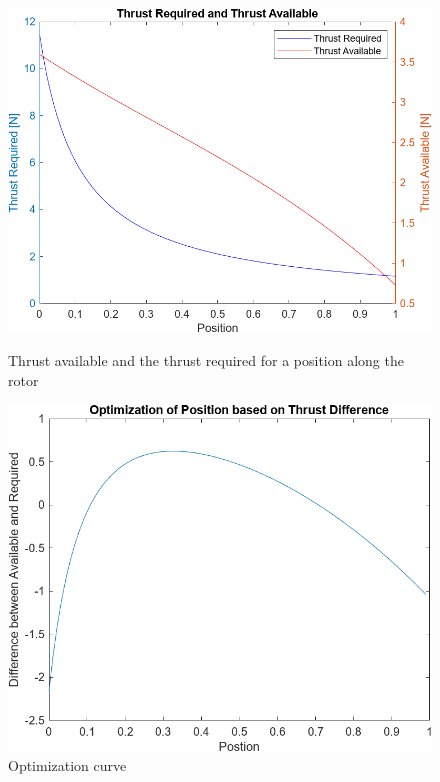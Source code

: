         \begin{figure}[h]
            \centering
            \begin{minipage}{0.45\textwidth}
                \centering
                \includegraphics*[width = \textwidth]{figs/Model/Rotor/Thrust_avaliable_vs_required.png}
                \caption[Thrust available and required for tip-thrust positions]{Thrust available and the thrust required for a position along the rotor}
                \label{fig: thrust_req_vs_available}
            \end{minipage}\hfill
            \begin{minipage}{0.45\textwidth}
                \centering
                \includegraphics*[width =\textwidth]{figs/Model/Rotor/Optimisation_curve.png}
                \caption{Optimization curve}
                \label{fig: optimization_curve}
            \end{minipage}
        \end{figure} 
